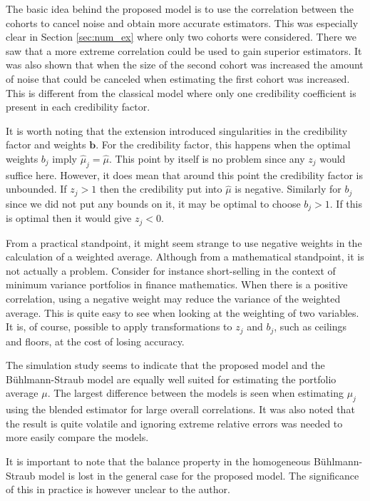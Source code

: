 \documentclass[11pt]{article}
\theoremstyle{definition}
\begin{document}
The basic idea behind the proposed model is to use the correlation between the cohorts to cancel noise and obtain more accurate estimators. This was especially clear in Section \ref{sec:num_ex} where only two cohorts were considered. There we saw that a more extreme correlation could be used to gain superior estimators. It was also shown that when the size of the second cohort was increased the amount of noise that could be canceled when estimating the first cohort was increased. This is different from the classical model where only one credibility coefficient is present in each credibility factor.

It is worth noting that the extension introduced singularities in the credibility factor and weights $\bm b$. For the credibility factor, this happens when the optimal weights $b_j$ imply $\hat\mu_j = \hat\mu$. This point by itself is no problem since any $z_j$ would suffice here. However, it does mean that around this point the credibility factor is unbounded. If $z_j>1$ then the credibility put into $\hat\mu$ is negative. Similarly for $b_j$ since we did not put any bounds on it, it may be optimal to choose $b_j>1$. If this is optimal then it would give $z_j<0$. 

From a practical standpoint, it might seem strange to use negative weights in the calculation of a weighted average. Although from a mathematical standpoint, it is not actually a problem. Consider for instance short-selling in the context of minimum variance portfolios in finance mathematics. When there is a positive correlation, using a negative weight may reduce the variance of the weighted average. This is quite easy to see when looking at the weighting of two variables. It is, of course, possible to apply transformations to $z_j$ and $b_j$, such as ceilings and floors, at the cost of losing accuracy.

The simulation study seems to indicate that the proposed model and the Bühlmann-Straub model are equally well suited for estimating the portfolio average $\mu$. The largest difference between the models is seen when estimating $\mu_j$ using the blended estimator for large overall correlations. It was also noted that the result is quite volatile and ignoring extreme relative errors was needed to more easily compare the models.

It is important to note that the balance property in the homogeneous Bühlmann-Straub model is lost in the general case for the proposed model. The significance of this in practice is however unclear to the author.
\end{document}
